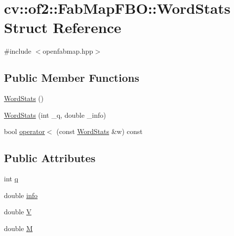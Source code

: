 \hypertarget{structcv_1_1of2_1_1FabMapFBO_1_1WordStats}{\section{cv\-:\-:of2\-:\-:Fab\-Map\-F\-B\-O\-:\-:Word\-Stats Struct Reference}
\label{structcv_1_1of2_1_1FabMapFBO_1_1WordStats}
}


{\ttfamily \#include $<$openfabmap.\-hpp$>$}

\subsection*{Public Member Functions}
\begin{DoxyCompactItemize}
\item 
\hyperlink{structcv_1_1of2_1_1FabMapFBO_1_1WordStats_a5b1b36d43528a8aeb3ad2801c90f26ea}{Word\-Stats} ()
\item 
\hyperlink{structcv_1_1of2_1_1FabMapFBO_1_1WordStats_a78787ac245a01a2ce7811307f042ca42}{Word\-Stats} (int \-\_\-q, double \-\_\-info)
\item 
bool \hyperlink{structcv_1_1of2_1_1FabMapFBO_1_1WordStats_a551bf012038e3d2d3b192b876708a181}{operator$<$} (const \hyperlink{structcv_1_1of2_1_1FabMapFBO_1_1WordStats}{Word\-Stats} \&w) const 
\end{DoxyCompactItemize}
\subsection*{Public Attributes}
\begin{DoxyCompactItemize}
\item 
int \hyperlink{structcv_1_1of2_1_1FabMapFBO_1_1WordStats_aa30b1af6bd5a967a5ff6140c0edf0ce2}{q}
\item 
double \hyperlink{structcv_1_1of2_1_1FabMapFBO_1_1WordStats_a90a54a427a7da6ae088ea995b69149da}{info}
\item 
double \hyperlink{structcv_1_1of2_1_1FabMapFBO_1_1WordStats_ad10ad107d7bbe868ff8f5a1b9691b994}{V}
\item 
double \hyperlink{structcv_1_1of2_1_1FabMapFBO_1_1WordStats_aae5faa264a3be1185fd1dd964ed23c66}{M}
\end{DoxyCompactItemize}


